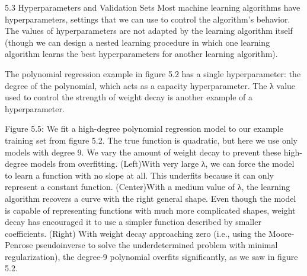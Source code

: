 \documentclass[11pt]{article}
\begin{document}
5.3 Hyperparameters and Validation Sets
Most machine learning algorithms have hyperparameters, settings that we can use to control the algorithm’s behavior.
The values of hyperparameters are not adapted by the learning algorithm itself (though we can design a nested learning procedure in which one learning algorithm learns the best hyperparameters for another learning algorithm).

The polynomial regression example in ﬁgure 5.2 has a single hyperparameter: the degree of the polynomial, which acts as a capacity hyperparameter.
The λ value used to control the strength of weight decay is another example of a hyperparameter.

Figure 5.5: We ﬁt a high-degree polynomial regression model to our example training set
from ﬁgure 5.2. The true function is quadratic, but here we use only models with degree 9.
We vary the amount of weight decay to prevent these high-degree models from overﬁtting.
(Left)With very large λ, we can force the model to learn a function with no slope at all.
This underﬁts because it can only represent a constant function.
(Center)With a medium value of λ, the learning algorithm recovers a curve with the right general shape.
Even though the model is capable of representing functions with much more complicated shapes, weight decay has encouraged it to use a simpler function described by smaller coeﬃcients. (Right)
With weight decay approaching zero (i.e., using the Moore-Penrose pseudoinverse to solve the underdetermined problem with minimal regularization), the degree-9 polynomial overﬁts signiﬁcantly, as we saw in ﬁgure 5.2.
\end{document}
